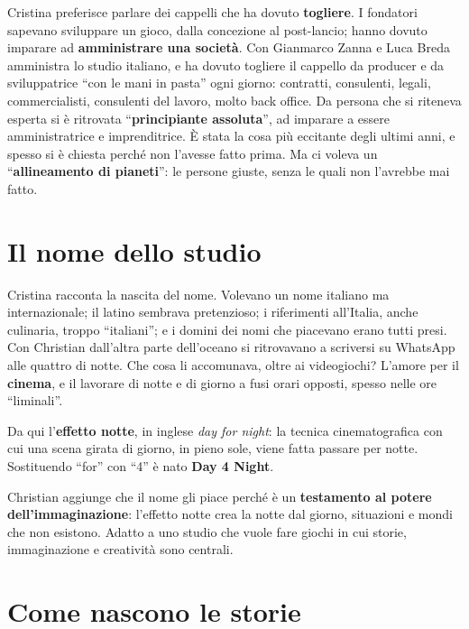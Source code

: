 Cristina preferisce parlare dei cappelli che ha dovuto \textbf{togliere}. I
fondatori sapevano sviluppare un gioco, dalla concezione al post-lancio; hanno
dovuto imparare ad \textbf{amministrare una società}. Con Gianmarco Zanna e Luca
Breda amministra lo studio italiano, e ha dovuto togliere il cappello da producer e
da sviluppatrice ``con le mani in pasta'' ogni giorno: contratti, consulenti,
legali, commercialisti, consulenti del lavoro, molto back office. Da persona che si
riteneva esperta si è ritrovata ``\textbf{principiante assoluta}'', ad imparare a
essere amministratrice e imprenditrice. È stata la cosa più eccitante degli ultimi
anni, e spesso si è chiesta perché non l'avesse fatto prima. Ma ci voleva un
``\textbf{allineamento di pianeti}'': le persone giuste, senza le quali non
l'avrebbe mai fatto.

\section{Il nome dello studio}
\label{sec:c3-4-nome}

Cristina racconta la nascita del nome. Volevano un nome italiano ma internazionale;
il latino sembrava pretenzioso; i riferimenti all'Italia, anche culinaria, troppo
``italiani''; e i domini dei nomi che piacevano erano tutti presi. Con Christian
dall'altra parte dell'oceano si ritrovavano a scriversi su WhatsApp alle quattro di
notte. Che cosa li accomunava, oltre ai videogiochi? L'amore per il
\textbf{cinema}, e il lavorare di notte e di giorno a fusi orari opposti, spesso
nelle ore ``liminali''.

Da qui l'\textbf{effetto notte}, in inglese \emph{day for night}: la tecnica
cinematografica con cui una scena girata di giorno, in pieno sole, viene fatta
passare per notte. Sostituendo ``for'' con ``4'' è nato \textbf{Day 4 Night}.

Christian aggiunge che il nome gli piace perché è un \textbf{testamento al potere
dell'immaginazione}: l'effetto notte crea la notte dal giorno, situazioni e mondi
che non esistono. Adatto a uno studio che vuole fare giochi in cui storie,
immaginazione e creatività sono centrali.

\section{Come nascono le storie}
\label{sec:c3-4-storie}

